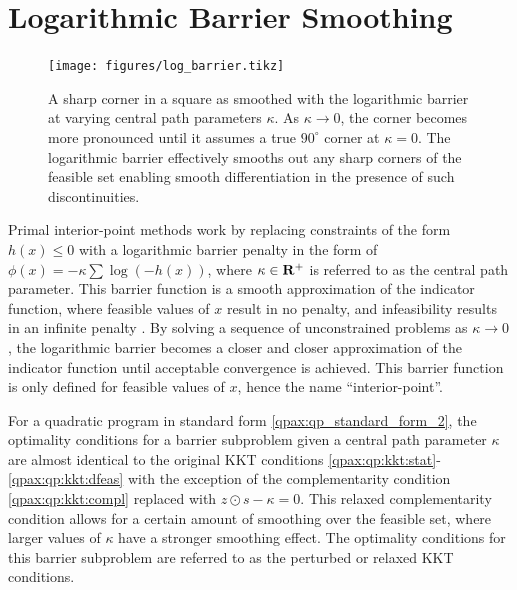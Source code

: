 \section{Logarithmic Barrier Smoothing}
%
%
%
%
\begin{figure}[t!]
    \centering
    \hspace{0cm}
    \texttt{[image: figures/log\_barrier.tikz]}
    \caption{A sharp corner in a square as smoothed with the logarithmic barrier at varying central path parameters $\kappa$. As $\kappa \rightarrow 0$, the corner becomes more pronounced until it assumes a true $90^\circ$ corner at $\kappa = 0$. The logarithmic barrier effectively smooths out any sharp corners of the feasible set enabling smooth differentiation in the presence of such discontinuities.}
    \label{qpax:fig:log_barrier}
\end{figure}
Primal interior-point methods work by replacing constraints of the form $h(x) \leq 0$ with a logarithmic barrier penalty in the form of $\phi(x) = - \kappa \sum \log(-h(x))$, where $\kappa \in \mathbf{R}^{+}$ is referred to as the central path parameter. This barrier function is a smooth approximation of the indicator function, where feasible values of $x$ result in no penalty, and infeasibility results in an infinite penalty \cite{boyd2004}. By solving a sequence of unconstrained problems as $\kappa \rightarrow 0$, the logarithmic barrier becomes a closer and closer approximation of the indicator function until acceptable convergence is achieved. This barrier function is only defined for feasible values of $x$, hence the name ``interior-point''.

For a quadratic program in standard form \eqref{qpax:qp_standard_form_2}, the optimality conditions for a barrier subproblem given a central path parameter $\kappa$ are
almost identical to the original KKT conditions \eqref{qpax:qp:kkt:stat}-\eqref{qpax:qp:kkt:dfeas} with the exception of the complementarity condition \eqref{qpax:qp:kkt:compl} replaced with $z \odot s - \kappa = 0$.  This relaxed complementarity condition allows for a certain amount of smoothing over the feasible set, where larger values of $\kappa$ have a stronger smoothing effect. The optimality conditions for this barrier subproblem are referred to as the perturbed or relaxed KKT conditions.
%
